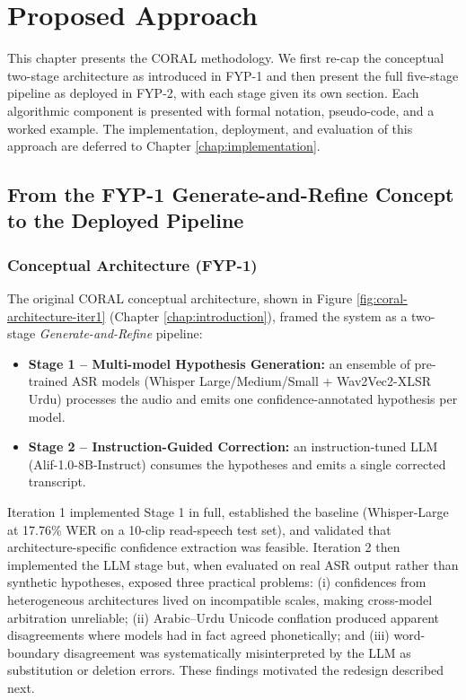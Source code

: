 \chapter{Proposed Approach}
\label{chap:approach}

This chapter presents the CORAL methodology. We first re-cap the conceptual two-stage architecture as introduced in FYP-1 and then present the full five-stage pipeline as deployed in FYP-2, with each stage given its own section. Each algorithmic component is presented with formal notation, pseudo-code, and a worked example. The implementation, deployment, and evaluation of this approach are deferred to Chapter \ref{chap:implementation}.

\section{From the FYP-1 Generate-and-Refine Concept to the Deployed Pipeline}
\label{sec:concept-to-pipeline}

\subsection{Conceptual Architecture (FYP-1)}
The original CORAL conceptual architecture, shown in Figure \ref{fig:coral-architecture-iter1} (Chapter \ref{chap:introduction}), framed the system as a two-stage \emph{Generate-and-Refine} pipeline:

\begin{itemize}
 \item \textbf{Stage 1 -- Multi-model Hypothesis Generation:} an ensemble of pre-trained ASR models (Whisper Large/Medium/Small + Wav2Vec2-XLSR Urdu) processes the audio and emits one confidence-annotated hypothesis per model.
 \item \textbf{Stage 2 -- Instruction-Guided Correction:} an instruction-tuned LLM (Alif-1.0-8B-Instruct) consumes the hypotheses and emits a single corrected transcript.
\end{itemize}

Iteration 1 implemented Stage 1 in full, established the baseline (Whisper-Large at 17.76\% WER on a 10-clip read-speech test set), and validated that architecture-specific confidence extraction was feasible. Iteration 2 then implemented the LLM stage but, when evaluated on real ASR output rather than synthetic hypotheses, exposed three practical problems: (i) confidences from heterogeneous architectures lived on incompatible scales, making cross-model arbitration unreliable; (ii) Arabic--Urdu Unicode conflation produced apparent disagreements where models had in fact agreed phonetically; and (iii) word-boundary disagreement was systematically misinterpreted by the LLM as substitution or deletion errors. These findings motivated the redesign described next.

